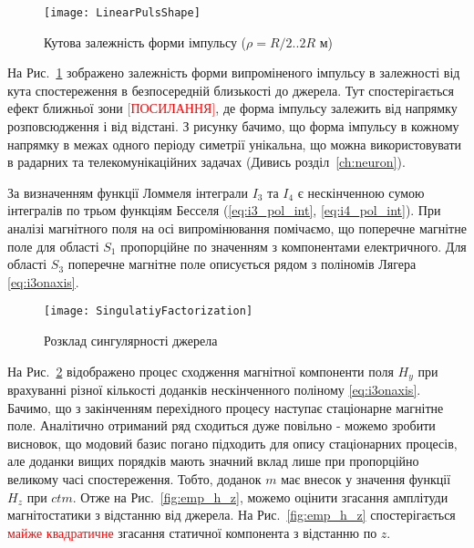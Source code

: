 \begin{figure}[h] \begin{center}
\texttt{[image: LinearPulsShape]}
\caption{Кутова залежність форми імпульсу ($ \rho = R/2 .. 2R $ м)} 
\label{fig:emp_shape}
\end{center} \end{figure}

На Рис.~\ref{fig:emp_shape} зображено залежність форми випроміненого 
імпульсу в залежності від кута спостереження в безпосередній близькості 
до джерела. Тут спостерігається ефект ближньої зони 
\textcolor{red}{[ПОСИЛАННЯ]}, де форма імпульсу залежить від напрямку 
розповсюдження і від відстані. З рисунку бачимо, що форма імпульсу в 
кожному напрямку в межах одного періоду симетрії унікальна, що можна 
використовувати в радарних та телекомунікаційних задачах 
(Дивись розділ~\ref{ch:neuron}).

За визначенням функції Ломмеля інтеграли $ I_3 $ та $ I_4 $ є 
нескінченною сумою інтегралів по трьом функціям Бесселя 
(\eqref{eq:i3_pol_int}, \eqref{eq:i4_pol_int}). При аналізі магнітного 
поля на осі випромінювання помічаємо, що поперечне магнітне поле для 
області $ S_1 $ пропорційне по значенням з компонентами 
електричного. Для області $ S_3 $ поперечне магнітне поле описується 
рядом з поліномів Лягера \eqref{eq:i3onaxis}.

\begin{figure}[h] \begin{center}
\texttt{[image: SingulatiyFactorization]}
\caption{Розклад сингулярності джерела} \label{fig:singulatiy_factorization}
\end{center} \end{figure}

На Рис.~\ref{fig:singulatiy_factorization} відображено процес сходження 
магнітної компоненти поля $ H_y $ при врахуванні різної кількості доданків
нескінченного поліному \eqref{eq:i3onaxis}. Бачимо, що з закінченням 
перехідного процесу наступає стаціонарне магнітне поле. Аналітично отриманий 
ряд сходиться дуже повільно - можемо зробити висновок, що модовий базис 
погано підходить для опису стаціонарних процесів, але доданки вищих порядків 
мають значний вклад лише при пропорційно великому часі спостереження.
Тобто, доданок $ m $ має внесок у значення функції $ H_z $ при $ ctm $.
Отже на Рис.~\ref{fig:emp_h_z}, можемо оцінити згасання амплітуди 
магнітостатики з відстанню від джерела. На Рис.~\ref{fig:emp_h_z} 
спостерігається \textcolor{red}{майже квадратичне} згасання статичної 
компонента з відстанню по $ z $. 

